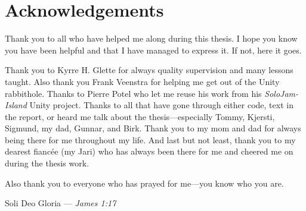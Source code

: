 \chapter*{Acknowledgements} %

Thank you to all who have helped me along during this thesis. I hope you know you have been helpful and that I have managed to express it. If not, here it goes.

Thank you to Kyrre H. Glette for always quality supervision and many lessons taught. Also thank you Frank Veenstra for helping me get out of the Unity rabbithole. Thanks to Pierre Potel who let me reuse his work from his \textit{SoloJam-Island} Unity project. Thanks to all that have gone through either code, text in the report, or heard me talk about the thesis—especially Tommy, Kjersti, Sigmund, my dad, Gunnar, and Birk. Thank you to my mom and dad for always being there for me throughout my life. And last but not least, thank you to my dearest fiancée (my Jari) who has always been there for me and cheered me on during the thesis work.

Also thank you to everyone who has prayed for me—you know who you are. \nl

{\huge \gothfamily Soli Deo Gloria} — \textit{James 1:17}